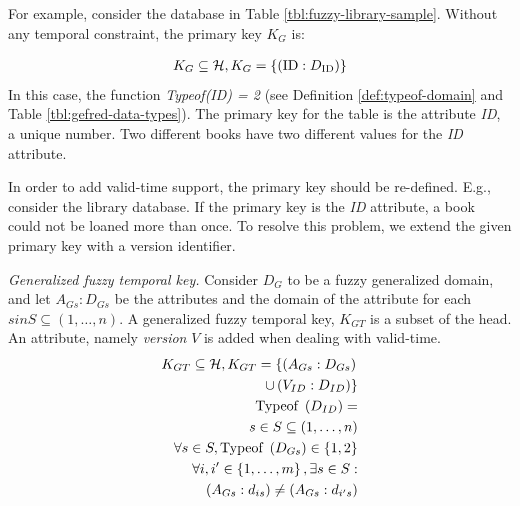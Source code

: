 For example, consider the database in Table \ref{tbl:fuzzy-library-sample}. Without any temporal constraint, the primary key $K_G$ is:

\begin{align}
\nonumber
K_G \subseteq \mathcal{H}, K_G = \left \lbrace  \left(\text{ID}:D_{\text{ID}} \right) \right \rbrace
\end{align}
In this case, the function \emph{Typeof(ID) = 2} (see Definition \ref{def:typeof-domain} and Table \ref{tbl:gefred-data-types}). The primary key for the table is the attribute \emph{ID}, a unique number. Two different books have two different values for the \emph{ID} attribute.

In order to add valid-time support, the primary key should be re-defined. E.g., consider the library database. If the primary key is the \emph{ID} attribute, a book could not be loaned more than once. To resolve this problem, we extend the given primary key with a version identifier. 



\begin{definition}
\label{def:generalized-fuzzy-temporal-key}
\emph{Generalized fuzzy temporal key.}
Consider $D_G$ to be a fuzzy generalized domain, and let $A_{Gs}:D_{Gs}$ be the attributes and the domain of the attribute for each $s in S \subseteq \left(1, \ldots, n \right)$.
A generalized fuzzy temporal key, $K_{GT}$ is a subset of the head. An attribute, namely \emph{version} $V$ is added when dealing with valid-time.
\begin{align}
\label{eq:generalized-fuzzy-temporal-key}
K_{GT} \subseteq \mathcal{H}, K_{GT} = \left \lbrace  \left(A_{Gs}:D_{Gs} \right) \right.  \\
\nonumber
 \left. \cup  \left(V_{ID}:D_{ID} \right)	\right \rbrace \\
\nonumber
\text{Typeof }\left(D_{ID} \right) = \\
\nonumber
s\in S \subseteq \left(1, \ldots, n \right) \\
\nonumber
\forall s \in S, \text{Typeof } \left(D_{Gs} \right) \in \left \lbrace 1, 2 \right \rbrace \\
\nonumber
\forall i, i' \in \left \lbrace 1, \ldots, m\right \rbrace , \exists s \in S: \\
\nonumber
\left(A_{Gs}:d_{is} \right) \neq \left(A_{Gs}:d_{i's} \right)
\end{align}
\end{definition}

